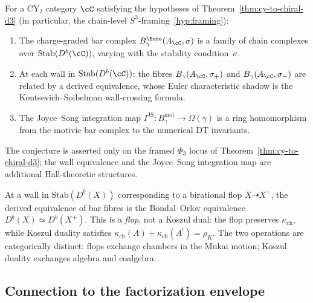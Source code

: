 \begin{conjecture}
\label{conj:categorical-dt-cy3}
\ClaimStatusConjectured
For a CY$_3$ category $\cC$ satisfying the hypotheses of Theorem~\textup{\ref{thm:cy-to-chiral-d3}} (in particular, the chain-level $S^3$-framing~\ref{hyp:framing}):
\begin{enumerate}[label=\textup{(\roman*)}]
 \item The charge-graded bar complex $B_\gamma^{\Eone}(A_\cC, \sigma)$ is a family of chain complexes over $\mathrm{Stab}(D^b(\cC))$, varying with the stability condition~$\sigma$.
 \item At each wall in $\mathrm{Stab}(D^b(\cC))$: the fibres $B_\gamma(A_\cC, \sigma_+)$ and $B_\gamma(A_\cC, \sigma_-)$ are related by a derived equivalence, whose Euler characteristic shadow is the Kontsevich--Soibelman wall-crossing formula.
 \item The Joyce--Song integration map $I^{\mathrm{JS}} \colon B_\gamma^{\mathrm{mot}} \to \Omega(\gamma)$ is a ring homomorphism from the motivic bar complex to the numerical DT invariants.
\end{enumerate}
The conjecture is asserted only on the framed $\Phi_3$ locus of
Theorem~\textup{\ref{thm:cy-to-chiral-d3}}; the wall equivalence and the
Joyce--Song integration map are additional Hall-theoretic structures.
\end{conjecture}

\begin{remark}
\label{rem:categorical-dt-flop-koszul}
At a wall in $\mathrm{Stab}(D^b(X))$ corresponding to a birational flop $X \dashrightarrow X^+$, the derived equivalence of bar fibres is the Bondal--Orlov equivalence $D^b(X) \simeq D^b(X^+)$. This is a \emph{flop}, not a Koszul dual: the flop preserves $\kappa_{\mathrm{ch}}$, while Koszul duality satisfies $\kappa_{\mathrm{ch}}(A) + \kappa_{\mathrm{ch}}(A^!) = \rho_K$. The two operations are categorically distinct: flops exchange chambers in the Mukai motion; Koszul duality exchanges algebra and coalgebra.
\end{remark}


\subsection{Connection to the factorization envelope}
\label{subsec:quiver-chart-envelope}

